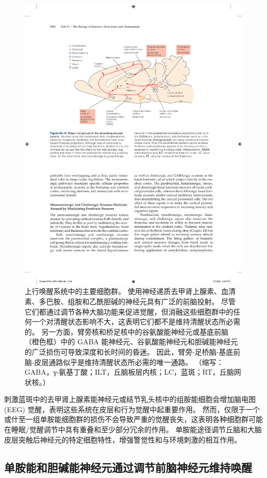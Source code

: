 \begin{figure}[htbp]
	\centering
	\includegraphics[width=0.8\linewidth]{chap40/fig_40_15}
	\caption{上行唤醒系统中的主要细胞群。 使用神经递质去甲肾上腺素、血清素、多巴胺、组胺和乙酰胆碱的神经元具有广泛的前脑投射。 尽管它们都通过调节各种大脑功能来促进觉醒，但消融这些细胞群中的任何一个对清醒状态影响不大，这表明它们都不是维持清醒状态所必需的。 另一方面，臂旁核和桥足核中的谷氨酸能神经元或基底前脑（橙色框）中的 GABA 能神经元、谷氨酸能神经元和胆碱能神经元的广泛损伤可导致深度和长时间的昏迷。 因此，臂旁-足桥脑-基底前脑-皮层通路似乎是维持清醒状态所必需的唯一通路。 （缩写：GABA，γ-氨基丁酸；ILT，丘脑板层内核；LC，蓝斑；RT，丘脑网状核。）}
	\label{fig:40_15}
\end{figure}


刺激蓝斑中的去甲肾上腺素能神经元或结节乳头核中的组胺能细胞会增加脑电图 (EEG) 觉醒，表明这些系统在皮层和行为觉醒中起重要作用。
然而，仅限于一个或什至一组单胺能细胞群的损伤不会导致严重的觉醒丧失，这表明各种细胞群可能在睡眠/觉醒调节中具有重叠和至少部分冗余的作用。
单胺能途径调节丘脑和大脑皮层突触后神经元的特定细胞特性，增强警觉性和与环境刺激的相互作用。



\subsection{单胺能和胆碱能神经元通过调节前脑神经元维持唤醒}

